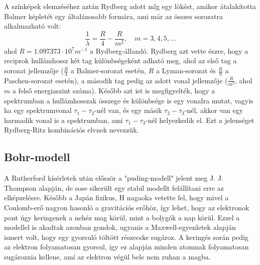 \documentclass[../main.tex]{subfiles}
\begin{document}
A színképek elemzéséhez aztán Rydberg adott mlg egy lökést, amikor átalakította Balmer képletét egy általánosabb formára, ami már az összes sorozatra alkalmazható volt:
\begin{equation}
    \frac{1}{\lambda} = \frac{R}{4} - \frac{R}{m^2}, \quad m = 3,4,5,... 
\end{equation}
ahol $R = 1.097373 \cdot 10^7 m^{-1}$ a Rydberg-állandó. Rydberg azt vette észre, hogy a reciprok hullámhossz két tag különbségeként adható meg, ahol az első tag
a sorozat jellemzője ($\frac{R}{4}$ a Balmer-sorozat esetén, $R$ a Lyman-sorozat és $\frac{R}{9}$ a Paschen-sorozat esetén), a második tag pedig az adott vonal jellemzője ($\frac{R}{m^2}$, ahol $m$ a felső energiaszint száma).
Később azt ist is megfigyelték, hogy a spektrumban a hullámhosszak összege és különbsége is egy vonalra mutat, vagyis ha egy spektrumvonal $\tau_1 - \tau_2$-nél van,
és egy másik $\tau_2 - \tau_3$-nél, akkor van egy harmadik vonal is a spektrumban, ami $\tau_1 - \tau_3$-nél helyezkedik el. Ezt a jelenséget Rydberg-Ritz kombinációs elvnek nevezzük.

\subsection{Bohr-modell}
A Rutherford kísérletek után először a "puding-modell" jelent meg J. J. Thompson alapján, de sose sikerült egy stabil modellt felállítani erre az elképzelésre. Később a Japán fizikus, H nagaoka vetette fel,
hogy mivel a Coulomb-erő nagyon hasonló a gravitációs erőhöz, így lehet, hogy az elektronok pont úgy keringenek a nehéz mag körül, mint a bolygók a nap körül. Ezzel a modellel is akadtak azonban gondok,
ugyanis a Maxwell-egyenletek alapján ismert volt, hogy egy gyorsuló töltött részecske sugároz. A keringés során pedig az elektron folyamatosan gyorsul, így ez alapján minden atomnak folyamatosan sugároznia kellene,
amí az elektron végül bele nem zuhan a magba.
\end{document}
